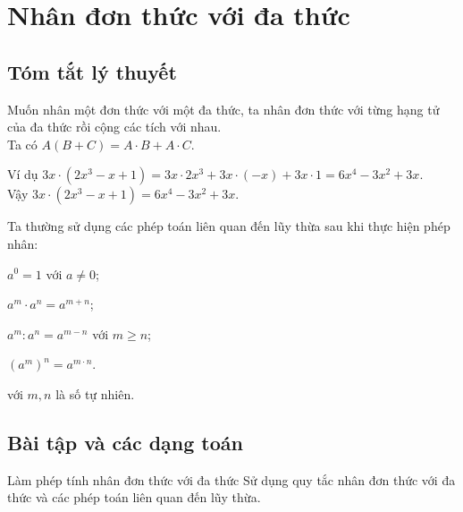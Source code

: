\section{Nhân đơn thức với đa thức}
\subsection{Tóm tắt lý thuyết}
\begin{tomtat}
\begin{dn}
Muốn nhân một đơn thức với một đa thức, ta nhân đơn thức với từng hạng tử của đa thức rồi cộng các tích với nhau.\\
Ta có $A(B+C)=A\cdot B+A\cdot C$.
\end{dn}
Ví dụ $ 3x\cdot(2x^3-x+1)= 3x\cdot 2x^3+3x\cdot(-x)+3x\cdot 1= 6x^4-3x^2+3x $.\\
Vậy $3x\cdot(2x^3-x+1)=6x^4-3x^2+3x$.
\begin{note}
	Ta thường sử dụng các phép toán liên quan đến lũy thừa sau khi thực hiện phép nhân:
	\begin{enumEX}[$\bullet$]{2}
	    \item $a^0=1$ với $a\ne 0$;
	    \item $a^m\cdot a^n=a^{m+n}$;
	    \item $a^m:a^n=a^{m-n}$ với $m\ge n$;
	    \item $(a^m)^n=a^{m\cdot n}$.
	\end{enumEX}
	với $m,n$ là số tự nhiên.
\end{note}
\end{tomtat}

\subsection{Bài tập và các dạng toán}

\begin{dang}{Làm phép tính nhân đơn thức với đa thức}
Sử dụng quy tắc nhân đơn thức với đa thức và các phép toán liên quan đến lũy thừa.
\end{dang}


